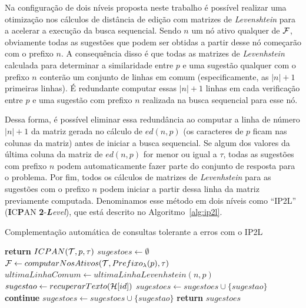 Na configuração de dois níveis proposta neste trabalho é possível realizar uma otimização nos cálculos de distância de edição com matrizes de \textit{Levenshtein} para a acelerar a execução da busca sequencial. Sendo $n$ um nó ativo qualquer de $\mathcal{F}$, obviamente todas as sugestões que podem ser obtidas a partir desse nó começarão com o prefixo $n$. A consequência disso é que todas as matrizes de \textit{Levenhstein} calculada para determinar a similaridade entre $p$ e uma sugestão qualquer com o prefixo $n$ conterão um conjunto de linhas em comum (especificamente, as $|n|+1$ primeiras linhas). É redundante computar essas $|n|+1$ linhas em cada verificação entre $p$ e uma sugestão com prefixo $n$ realizada na busca sequencial para esse nó. 

Dessa forma, é possível eliminar essa redundância ao computar a linha de número $|n|+1$ da matriz gerada no cálculo de $ed(n,p)$ (os caracteres de $p$ ficam nas colunas da matriz) antes de iniciar a busca sequencial. Se algum dos valores da última coluna da matriz de $ed(n,p)$ for menor ou igual a $\tau$, todas as sugestões com prefixo $n$ podem automaticamente fazer parte do conjunto de resposta para o problema. Por fim, todos os cálculos de matrizes de \textit{Levenhstein} para as sugestões com o prefixo $n$ podem iniciar a partir dessa linha da matriz previamente computada. Denominamos esse método em dois níveis como ``IP2L'' (\textbf{I}C\textbf{P}AN \textbf{2}-\textit{\textbf{L}evel}), que está descrito no Algoritmo~\ref{alg:ip2l}.

\begin{algorithm}[H]
\caption{Complementação automática de consultas tolerante a erros com o IP2L}\label{alg:ip2l}
\begin{algorithmic}[1]
     \textbf{return} $ICPAN(\mathcal{T},p,\tau)$
    \EndIf
    \State $sugestoes \leftarrow \emptyset$
    \State $\mathcal{F} \leftarrow computarNosAtivos(\mathcal{T}, Prefixo_{\lambda}(p), \tau)$ 
     
        \State $ultimaLinhaComum \leftarrow ultimaLinhaLevenhstein(n, p)$
                \State $sugestao \leftarrow recuperarTexto(\mathcal{H}[id])$
                    \State $sugestoes \leftarrow sugestoes \cup \{ sugestao \}$
                    \State \textbf{continue}
                \EndIf
                    \State $sugestoes \leftarrow sugestoes \cup \{ sugestao \}$
                \EndIf
            \EndFor
        \EndFor
    \EndFor
    \State \textbf{return} $sugestoes$
\EndFunction
\end{algorithmic}
\end{algorithm}

